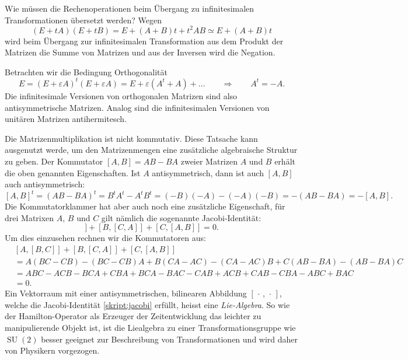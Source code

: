 Wie müssen die Rechenoperationen beim Übergang zu infinitesimalen
Transformationen übersetzt werden?
Wegen
\[
(E+tA)(E+tB)=E+(A+B)t + t^2AB\simeq E+(A+B)t
\]
wird beim Übergang zur infinitesimalen Transformation aus dem Produkt
der Matrizen die Summe von Matrizen und aus der Inversen wird die Negation.

Betrachten wir die Bedingung Orthogonalität
\[
E=
(E+\varepsilon A)^t(E+\varepsilon A)
=
E+\varepsilon (A^t+A) + \dots
\qquad
\Rightarrow
\qquad
A^t=-A.
\]
Die infinitesimale Versionen von orthogonalen Matrizen sind also
antisymmetrische Matrizen.
Analog sind die infinitesimalen Versionen von unitären Matrizen
antihermitesch.

Die Matrizenmultiplikation ist nicht kommutativ.
Diese Tatsache kann ausgenutzt werde, um den
Matrizenmengen eine zusätzliche algebraische Struktur zu geben.
%
Der Kommutator $[A,B]=AB-BA$ zweier Matrizen $A$ und $B$ erhält
die oben genannten Eigenschaften. Ist $A$ antisymmetrisch, dann
ist auch $[A,B]$ auch antisymmetrisch:
\[
[A,B]^t
=
(AB-BA)^t
=
B^tA^t-A^tB^t
=
(-B)(-A)-(-A)(-B)
=
-(AB-BA)
=
-[A,B].
\]
%
Die Kommutatorklammer hat aber auch noch eine zusätzliche Eigenschaft,
für drei Matrixen $A$, $B$ und $C$ gilt nämlich die sogenannte
Jacobi-Identität:
\begin{equation}
[A,[B, C]]
+
[B,[C, A]]
+
[C,[A, B]]
=
0.
\label{skript:jacobi}
\end{equation}
Um dies einzusehen rechnen wir die Kommutatoren aus:
\begin{align*}
&
[A,[B, C]]
+
[B,[C, A]]
+
[C,[A, B]]
\\
&=
A(BC-CB)-(BC-CB)A
+
B(CA-AC)-(CA-AC)B
+
C(AB-BA)-(AB-BA)C
\\
&=
ABC-ACB-BCA+CBA
+
BCA-BAC-CAB+ACB
+
CAB-CBA-ABC+BAC
\\
&=0.
\end{align*}
Ein Vektorraum mit einer antisymmetrischen, bilinearen Abbildung
$[\,\cdot\,,\,\cdot\,]$,
welche die Jacobi-Identität \eqref{skript:jacobi} erfüllt, heisst eine
{\em Lie-Algebra}.
%
So wie der Hamilton-Operator als Erzeuger der Zeitentwicklung das
leichter zu manipulierende Objekt ist, ist die Liealgebra zu einer
Transformationsgruppe wie $\operatorname{SU}(2)$ besser geeignet
zur Beschreibung von Transformationen und wird daher von Physikern
vorgezogen.

